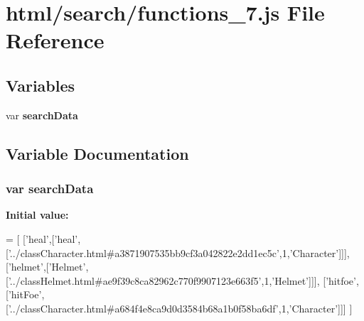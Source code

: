 \section{html/search/functions\-\_\-7.js File Reference}
\label{functions__7_8js}
\subsection*{Variables}
\begin{DoxyCompactItemize}
\item 
var {\bf search\-Data}
\end{DoxyCompactItemize}


\subsection{Variable Documentation}
\subsubsection[{search\-Data}]{\setlength{\rightskip}{0pt plus 5cm}var search\-Data}\label{functions__7_8js_ad01a7523f103d6242ef9b0451861231e}
{\bfseries Initial value\-:}
\begin{DoxyCode}
=
[
  [\textcolor{stringliteral}{'heal'},[\textcolor{stringliteral}{'heal'},[\textcolor{stringliteral}{'../classCharacter.html#a3871907535bb9cf3a042822e2dd1ec5c'},1,\textcolor{stringliteral}{'Character'}]]],
  [\textcolor{stringliteral}{'helmet'},[\textcolor{stringliteral}{'Helmet'},[\textcolor{stringliteral}{'../classHelmet.html#ae9f39c8ca82962c770f9907123e663f5'},1,\textcolor{stringliteral}{'Helmet'}]]],
  [\textcolor{stringliteral}{'hitfoe'},[\textcolor{stringliteral}{'hitFoe'},[\textcolor{stringliteral}{'../classCharacter.html#a684f4e8ca9d0d3584b68a1b0f58ba6df'},1,\textcolor{stringliteral}{'Character'}]]]
]
\end{DoxyCode}
